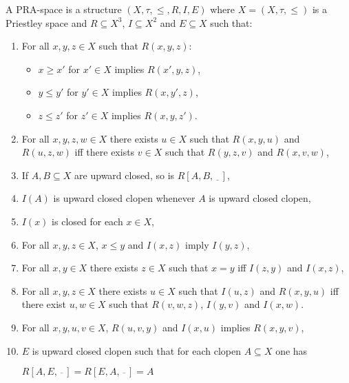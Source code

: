 \documentclass[a4paper]{article}
\theoremstyle{defin}
\theoremstyle{theorem}
\theoremstyle{claim}
\theoremstyle{prop}
\theoremstyle{lemma}
\theoremstyle{fact}
\theoremstyle{ex}
\theoremstyle{col}
\begin{document}
A PRA-space is a structure $(X, \tau, \leq, R, I, E)$ where $X = (X, \tau, \leq)$ is a Priestley space and $R \subseteq X^3$, $I \subseteq X^2$ and $E \subseteq X$ such that:
\begin{enumerate}
\item For all $x, y, z \in X$ such that $R(x, y, z)$:
\begin{itemize}
\item $x \geq x'$ for $x' \in X$ implies $R(x', y, z)$,
\item $y \leq y'$ for $y' \in X$ implies $R(x, y', z)$,
\item $z \leq z'$ for $z' \in X$ implies $R(x, y, z')$.
\end{itemize}
\item For all $x, y, z, w \in X$ there exists $u \in X$ such that $R(x, y, u)$ and $R(u, z, w)$ iff there exists $v \in X$ such that $R(y,z,v)$ and $R(x, v, w)$,
\item If $A, B \subseteq X$ are upward closed, so is $R[A, B, \underline{\:\:\:}]$,
\item $I(A)$ is upward closed clopen whenever $A$ is upward closed clopen,
\item $I(x)$ is closed for each $x \in X$,
\item For all $x, y, z \in X$, $x \leq y$ and $I(x, z)$ imply $I(y, z)$,
\item For all $x, y \in X$ there exists $z \in X$ such that $x = y$ iff $I(z, y)$ and $I(x, z)$,
\item For all $x, y, z \in X$ there exists $u \in X$ such that $I(u, z)$ and $R(x, y, u)$ iff there exist $u, w \in X$ such that $R(v, w, z)$, $I(y,v)$ and $I(x, w)$.
\item For all $x,y,u, v \in X$, $R(u,v,y)$ and $I(x, u)$ implies $R(x,y,v)$,
\item $E$ is upward closed clopen such that for each clopen $A \subseteq X$ one has
\begin{center}
$R[A, E, \overline{\:\:\:}] = R[E, A, \overline{\:\:\:}] = A$
\end{center}
\end{enumerate}
\end{document}
